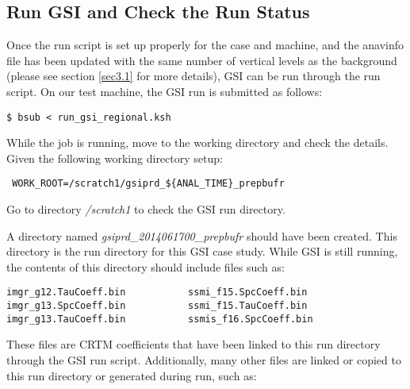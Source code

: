 \subsection{Run GSI and Check the Run Status}
\label{sec5.1.2}

Once the run script is set up properly for the case and machine, and the anavinfo file has been updated with the same number of vertical levels as the background (please see section \ref{sec3.1} for more details), GSI can be run through the run script. On our test machine, the GSI run is submitted as follows:

\begin{scriptsize}
\begin{verbatim}
$ bsub < run_gsi_regional.ksh
\end{verbatim}
\end{scriptsize}

While the job is running, move to the working directory and check the details. Given the following working directory setup:

\begin{scriptsize}
\begin{verbatim}
 WORK_ROOT=/scratch1/gsiprd_${ANAL_TIME}_prepbufr
\end{verbatim}
\end{scriptsize}

Go to directory \textit{/scratch1} to check the GSI run directory.

A directory named \textit{gsiprd\_2014061700\_prepbufr} should have been created.  This directory is the run directory for this GSI case study.  While GSI is still running, the contents of this directory should include files such as:

\begin{scriptsize}
\begin{verbatim}
imgr_g12.TauCoeff.bin        	ssmi_f15.SpcCoeff.bin
imgr_g13.SpcCoeff.bin        	ssmi_f15.TauCoeff.bin
imgr_g13.TauCoeff.bin        	ssmis_f16.SpcCoeff.bin
\end{verbatim}
\end{scriptsize}

These files are CRTM coefficients that have been linked to this run directory through the GSI run script.  Additionally, many other files are linked or copied to this run directory or generated during run, such as:

